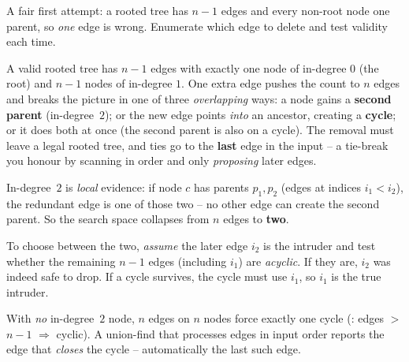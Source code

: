 \begin{attemptgate}
A fair first attempt: a rooted tree has $n-1$ edges and every non-root node one parent, so \emph{one}
edge is wrong. Enumerate which edge to delete and test validity each time.
\end{attemptgate}

A valid rooted tree has $n-1$ edges with exactly one node of in-degree $0$ (the root) and $n-1$ nodes
of in-degree $1$. One extra edge pushes the count to $n$ edges and breaks the picture in one of three
\emph{overlapping} ways: a node gains a \textbf{second parent} (in-degree~$2$); or the new edge points
\emph{into} an ancestor, creating a \textbf{cycle}; or it does both at once (the second parent is also
on a cycle). The removal must leave a legal rooted tree, and ties go to the \textbf{last} edge in the
input -- a tie-break you honour by scanning in order and only \emph{proposing} later edges.

\begin{observation}
In-degree~$2$ is \emph{local} evidence: if node $c$ has parents $p_1,p_2$ (edges at indices
$i_1<i_2$), the redundant edge is one of those two -- no other edge can create the second parent. So
the search space collapses from $n$ edges to \textbf{two}.
\end{observation}
\begin{observation}
To choose between the two, \emph{assume} the later edge $i_2$ is the intruder and test whether the
remaining $n-1$ edges (including $i_1$) are \emph{acyclic}. If they are, $i_2$ was indeed safe to
drop. If a cycle survives, the cycle must use $i_1$, so $i_1$ is the true intruder.
\end{observation}
\begin{observation}
With \emph{no} in-degree~$2$ node, $n$ edges on $n$ nodes force exactly one cycle
(: edges $>$ $n-1$ $\Rightarrow$ cyclic). A union-find that processes edges in input
order reports the edge that \emph{closes} the cycle -- automatically the last such edge.
\end{observation}


